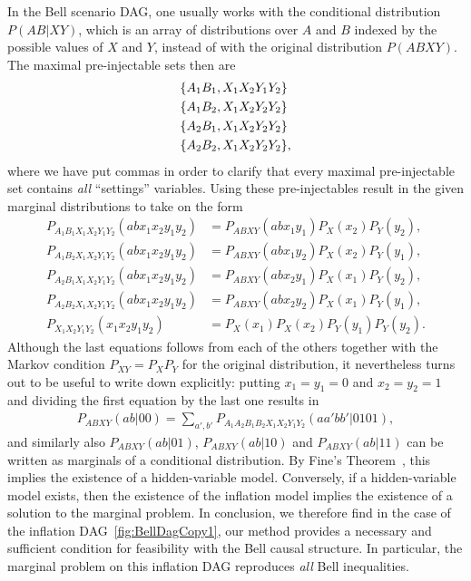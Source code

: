 In the Bell scenario DAG, one usually works with the conditional distribution $P(AB|XY)$, which is an array of distributions over $A$ and $B$ indexed by the possible values of $X$ and $Y$, instead of with the original distribution $P(ABXY)$. The maximal pre-injectable sets then are
\begin{align*}
&\brackets{A_1 B_1, X_1 X_2 Y_1 Y_2} \\
&\brackets{A_1 B_2, X_1 X_2 Y_2 Y_2} \\
&\brackets{A_2 B_1, X_1 X_2 Y_2 Y_2} \\
&\brackets{A_2 B_2, X_1 X_2 Y_2 Y_2} ,
\end{align*}
where we have put commas in order to clarify that every maximal pre-injectable set contains \emph{all} ``settings'' variables. Using these pre-injectables result in the given marginal distributions to take on the form
\begin{align*}
	P_{A_1 B_1 X_1 X_2 Y_1 Y_2}(a b x_1 x_2 y_1 y_2) & = P_{A B X Y}(a b x_1 y_1) P_X(x_2) P_Y(y_2), \\
	P_{A_1 B_2 X_1 X_2 Y_1 Y_2}(a b x_1 x_2 y_1 y_2) & = P_{A B X Y}(a b x_1 y_2) P_X(x_2) P_Y(y_1), \\
	P_{A_2 B_1 X_1 X_2 Y_1 Y_2}(a b x_1 x_2 y_1 y_2) & = P_{A B X Y}(a b x_2 y_1) P_X(x_1) P_Y(y_2), \\
	P_{A_2 B_2 X_1 X_2 Y_1 Y_2}(a b x_1 x_2 y_1 y_2) & = P_{A B X Y}(a b x_2 y_2) P_X(x_1) P_Y(y_1), \\
		P_{X_1 X_2 Y_1 Y_2}(x_1 x_2 y_1 y_2) & = P_X(x_1) P_X(x_2) P_Y(y_1) P_Y(y_2).
\end{align*}
Although the last equations follows from each of the others together with the Markov condition $P_{XY} = P_X P_Y$ for the original distribution, it nevertheless turns out to be useful to write down explicitly: putting $x_1 = y_1 = 0$ and $x_2 = y_2 = 1$ and dividing the first equation by the last one results in
\begin{align*}
	P_{A B X Y}(a b | 0 0)  =  \sum_{a',b'} P_{A_1 A_2 B_1 B_2 X_1 X_2 Y_1 Y_2}(aa'bb'|0101),
\end{align*}
and similarly also $P_{A B X Y}(a b | 0 1)$, $P_{A B X Y}(a b | 1 0)$ and $P_{A B X Y}(a b | 1 1)$ can be written as marginals of a conditional distribution. By Fine's Theorem~\cite{FineTheorem}, this implies the existence of a hidden-variable model. Conversely, if a hidden-variable model exists, then the existence of the inflation model implies the existence of a solution to the marginal problem. In conclusion, we therefore find in the case of the inflation DAG~\cref{fig:BellDagCopy1}, our method provides a necessary and sufficient condition for feasibility with the Bell causal structure. In particular, the marginal problem on this inflation DAG reproduces \emph{all} Bell inequalities.

